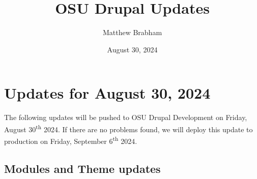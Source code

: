 
\title{OSU Drupal Updates}
\author{Matthew Brabham}
\date{August 30, 2024}

    \maketitle
    \tableofcontents


    \section{Updates for August 30, 2024}
    The following updates will be pushed to OSU Drupal Development on Friday, August 30\textsuperscript{th} 2024.
    If there are no problems found, we will deploy this update to production on Friday, September 6\textsuperscript{th} 2024.

    \subsection{Modules and Theme updates}

